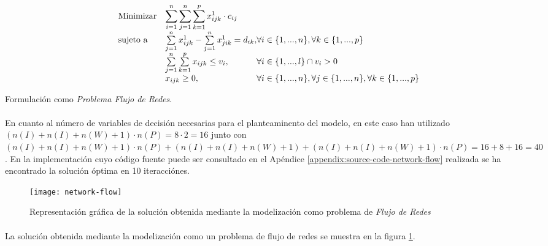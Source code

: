 \documentclass{article}
\begin{document}
    \begin{eqfloat}
      \begin{equation}
        \begin{array}{ll@{}ll}
          \text{Minimizar}	& \displaystyle \sum\limits_{i=1}^{n}\sum\limits_{j=1}^{n}\sum\limits_{k=1}^{p} x^{1}_{ijk} \cdot c_{ij} \\
          \text{sujeto a}		& \sum\limits_{j=1}^{n} x^{1}_{ijk} - \sum\limits_{j=1}^{n} x^{1}_{jik} = d_{ik}, & \forall i \in \{1,...,n\}, \forall k \in \{1,...,p\}\\
                            &	\sum\limits_{j=1}^{n}\sum\limits_{k=1}^{p}  x_{ijk}	\leq v_{i}, 		  & \forall i \in \{1,...,l\} \cap v_{i} > 0\\
                            & x_{ijk}	\geq 0, 	& \forall i \in \{1,...,n\}, \forall j \in \{1,...,n\}, \forall k \in \{1,...,p\}
        \end{array}
      \end{equation}
      \caption{Formulación como \emph{Problema Flujo de Redes}.}
      \label{eq:network-flow-model}
    \end{eqfloat}

    \paragraph{}
    En cuanto al número de variables de decisión necesarias para el planteaminento del modelo, en este caso han utilizado $ (n(I) + n(I) + n(W) + 1) \cdot n(P) = 8 \cdot 2 = 16$ junto con $(n(I) + n(I) + n(W) + 1) \cdot n(P) + (n(I) + n(I) + n(W) + 1) + (n(I) + n(I) + n(W) + 1) \cdot n(P) = 16 + 8 + 16 = 40$. En la implementación cuyo código fuente puede ser consultado en el Apéndice \ref{appendix:source-code-network-flow} realizada se ha encontrado la solución óptima en 10 iteracciónes.


    \begin{figure}[!hp]
      \centering
      \texttt{[image: network-flow]}
      \caption{Representación gráfica de la solución obtenida mediante la modelización como problema de \emph{Flujo de Redes}}
      \label{img:graph-network-flow}
    \end{figure}

    \paragraph{}
    La solución obtenida mediante la modelización como un problema de flujo de redes se muestra en la figura \ref{img:graph-network-flow}.
\end{document}

